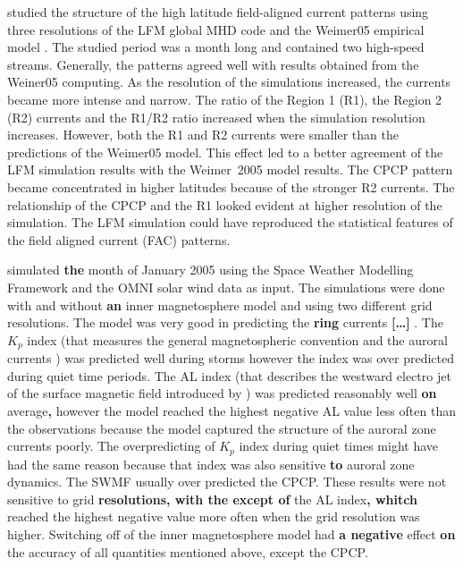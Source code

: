 \documentclass[linenumbers,draft]{agujournal}
\begin{document}
\citet{wiltberger17:_struc_high_latit_curren_magnet_ionos_model} studied the structure of the high latitude field-aligned current patterns using three resolutions of the LFM global MHD code and the Weimer05 empirical model \citep{weimer05:_improv_joule}. The studied period was a month long and contained two high-speed streams. Generally, the patterns agreed well with results obtained from the Weiner05 computing. As the resolution of the simulations increased, the currents became more intense and narrow. The ratio of the Region 1 (R1), the Region 2 (R2) currents and the R1/R2 ratio increased when the simulation resolution increases. However, both the R1 and R2 currents were smaller than the predictions of the Weimer05 model. This effect led to a better agreement of the LFM simulation results with the Weimer~2005 model results. The CPCP pattern became concentrated in higher latitudes because of the stronger R2 currents. The relationship of the CPCP and the R1 looked evident at higher resolution of the simulation. The LFM simulation could have reproduced the statistical features of the field aligned current (FAC) patterns. 

\citet{haiducek17:_swmf_global_magnet_simul_januar} simulated \textbf{the} month of January 2005 using the Space Weather Modelling Framework \citep[SWMF;][]{toth05:_space_weath_model_framew} and the OMNI solar wind data as input. The simulations were done with and without \textbf{an} inner magnetosphere model and using two different grid resolutions. The model was very good in predicting the \textbf{ring} currents \textbf{[\dots]} \citep[SYM-H; http://wdc.kugi.kyoto-u.ac.jp/aeasy/asy.pdf;][]{iyemori90:_storm}. The $K_p$ index (that measures the general magnetospheric convention and the auroral currents \citep{bartels39,rostoker72:_geomag,thomsen04:_why_kp}) was predicted well during storms however the index was over predicted during quiet time periods. The AL index (that describes the westward electro jet of the surface magnetic field introduced by \citet{davis66:_auror_ae}) was predicted reasonably well \textbf{on} average\textbf{,} however the model reached the highest negative AL value less often than the observations because the model captured the structure of the auroral zone currents poorly. The overpredicting of $K_p$ index during quiet times might have had the same reason because that index was also sensitive \textbf{to} auroral zone dynamics. The SWMF usually over predicted the CPCP. These results were not sensitive to grid \textbf{resolutions, with the except of} the AL index\textbf{, whitch} reached the highest negative value more often when the grid resolution was higher. Switching off of the inner magnetosphere model had \textbf{a negative} effect \textbf{on} the accuracy of all quantities mentioned above, except the CPCP. 
\end{document}
